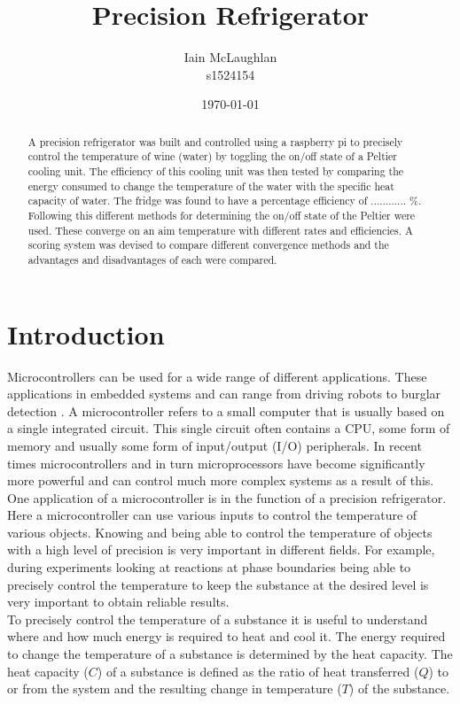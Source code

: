 \documentclass[10pt]{article}
\title{Precision Refrigerator}
\author{Iain McLaughlan\\ s1524154 }
\date{\today}
\begin{document}
\maketitle
\begin{abstract}
A precision refrigerator was built and controlled using a raspberry pi to precisely control the temperature of wine (water) by toggling the on/off state of a Peltier\cite{peltier} cooling unit. The efficiency of this cooling unit was then tested by comparing the energy consumed to change the temperature of the water with the specific heat capacity of water. The fridge was found to have a percentage efficiency of ............ \%. Following this different methods for determining the on/off state of the Peltier were used. These converge on an aim temperature with different rates and efficiencies. A scoring system was devised to compare different convergence methods and the advantages and disadvantages of each were compared.
\end{abstract}

\section*{Introduction}
Microcontrollers can be used for a wide range of different applications. These applications in embedded systems and can range from driving robots\cite{robomicro} to burglar detection \cite{microburg}. A microcontroller refers to a small computer that is usually based on a single integrated circuit. This single circuit often contains a CPU, some form of memory and usually some form of input/output (I/O) peripherals. In recent times microcontrollers and in turn microprocessors have become significantly more powerful and can control much more complex systems as a result of this.\\

One application of a microcontroller is in the function of a precision refrigerator. Here a microcontroller can use various inputs to control the temperature of various objects. Knowing and being able to control the temperature of objects with a high level of precision is very important in different fields. For example, during experiments looking at reactions at phase boundaries\cite{microfluidic} being able to precisely control the temperature to keep the substance at the desired level is very important to obtain reliable results.\\

To precisely control the temperature of a substance it is useful to understand where and how much energy is required to heat and cool it. The energy required to change the temperature of a substance is determined by the heat capacity. The heat capacity ($C$) of a substance is defined as the ratio of heat transferred ($Q$) to or from the system and the resulting change in temperature ($T$) of the substance.  %
\end{document}
